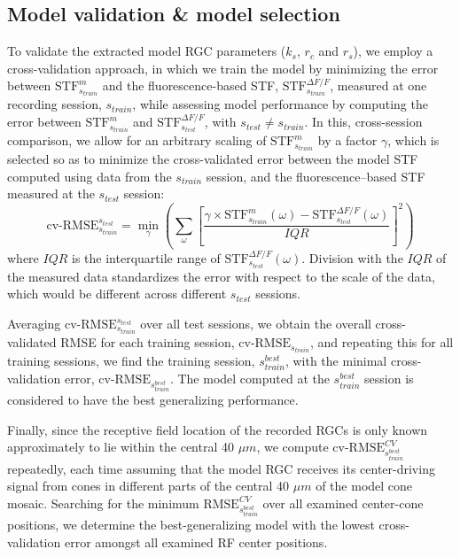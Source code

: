 \documentclass[11pt, oneside]{article}   	%
\begin{document}
\subsection{Model validation \& model selection}
To validate the extracted model RGC parameters ($k_s$, $r_c$ and $r_s$), we employ a cross-validation approach, in which we train the model by minimizing the error between $\mbox{STF}^{m}_{s_{train}}$ and the fluorescence-based STF, $\mbox{STF}^{\Delta F / F}_{s_{train}}$, measured at one recording session, $s_{train}$, while assessing model performance by computing the error between $\mbox{STF}^{m}_{s_{train}}$ and $\mbox{STF}^{\Delta F / F}_{s_{test}}$, with $s_{test} \ne  s_{train}$. In this, cross-session comparison, we allow for an arbitrary scaling of $\mbox{STF}^{m}_{s_{train}}$ by a factor $\gamma$, which is selected so as to minimize the cross-validated error between the model STF computed using data from the $s_{train}$ session, and the fluorescence--based STF measured at the $s_{test}$ session: 
%
\begin{equation}
\mbox{cv-RMSE}^{s_{test}}_{s_{train}} = \min_{\gamma} \left( \sum_{\omega} \left [  \frac{\gamma \times \mbox{STF}^{m}_{s_{train}}(\omega) - \mbox{STF}^{\Delta F / F}_{s_{test}}(\omega)}{IQR} \right ] ^2 \right)
\end{equation}
%
\noindent
where $IQR$ is the interquartile range of $\mbox{STF}^{\Delta F / F}_{s_{test}}(\omega)$. Division with the $IQR$ of the measured data standardizes the error with respect to the scale of the data, which would be different across different $s_{test}$ sessions.

Averaging $\mbox{cv-RMSE}^{s_{test}}_{s_{train}}$ over all test sessions, we obtain the overall cross-validated RMSE for each training session, $\mbox{cv-RMSE}_{s_{train}}$, and repeating this for all training sessions, we find the training session, $s_{train}^{best}$, with the minimal cross-validation error, $\mbox{cv-RMSE}_{s_{train}^{best}}$. The model computed at the $s_{train}^{best}$ session is considered to have the best generalizing performance.

Finally, since the receptive field location of the recorded RGCs is only known approximately to lie within the central 40 $\mu m$, we compute $\mbox{cv-RMSE}^{CV}_{s_{train}^{best}}$ repeatedly, each time assuming that the model RGC receives its center-driving signal from cones in different parts of the central 40 $\mu m$ of the model cone mosaic. Searching for the minimum $\mbox{RMSE}^{CV}_{s_{train}^{best}}$ over all examined center-cone positions, we determine the best-generalizing model with the lowest cross-validation error amongst all examined RF center positions.
\end{document}
